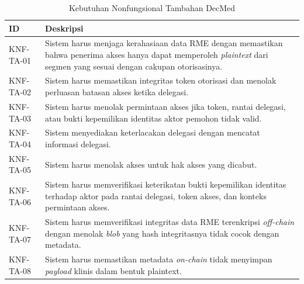\begin{table}[H]
	\centering
	\caption{Kebutuhan Nonfungsional Tambahan DecMed}
	\label{tab:kebutuhan-nonfungsional-tambahan-decmed}
	\small
	\begin{tabular}{|p{2cm}|p{10.5cm}|}
		\hline
		\textbf{ID} & \textbf{Deskripsi}                                                                                                                                                              \\
		\hline
		KNF-TA-01   & Sistem harus menjaga kerahasiaan data RME dengan memastikan bahwa penerima akses hanya dapat memperoleh \textit{plaintext} dari segmen yang sesuai dengan cakupan otorisasinya. \\ \hline
		KNF-TA-02   & Sistem harus memastikan integritas token otorisasi dan menolak perluasan batasan akses ketika delegasi.                                                                         \\ \hline
		KNF-TA-03   & Sistem harus menolak permintaan akses jika token, rantai delegasi, atau bukti kepemilikan identitas aktor pemohon tidak valid.                                                  \\ \hline
		KNF-TA-04   & Sistem menyediakan keterlacakan delegasi dengan mencatat informasi delegasi.                                                                                                    \\ \hline
		KNF-TA-05   & Sistem harus menolak akses untuk hak akses yang dicabut.                                                                                                                        \\ \hline
		KNF-TA-06   & Sistem harus memverifikasi keterikatan bukti kepemilikan identitas terhadap aktor pada rantai delegasi, token akses, dan konteks permintaan akses.                              \\ \hline
		KNF-TA-07   & Sistem harus memverifikasi integritas data RME terenkripsi \textit{off-chain} dengan menolak \textit{blob} yang hash integritasnya tidak cocok dengan metadata.                 \\ \hline
		KNF-TA-08   & Sistem harus memastikan metadata \textit{on-chain} tidak menyimpan \textit{payload} klinis dalam bentuk plaintext.                                                              \\ \hline
	\end{tabular}
\end{table}
\FloatBarrier

